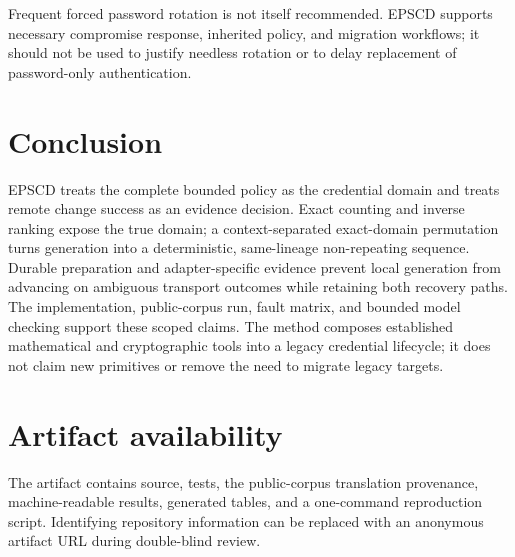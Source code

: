 \documentclass[preprint,12pt]{elsarticle}
\begin{document}
Frequent forced password rotation is not itself recommended. EPSCD supports
necessary compromise response, inherited policy, and migration workflows; it
should not be used to justify needless rotation or to delay replacement of
password-only authentication.

\section{Conclusion}

EPSCD treats the complete bounded policy as the credential domain and treats
remote change success as an evidence decision. Exact counting and inverse
ranking expose the true domain; a context-separated exact-domain permutation
turns generation into a deterministic, same-lineage non-repeating sequence.
Durable preparation and adapter-specific evidence prevent local generation from
advancing on ambiguous transport outcomes while retaining both recovery paths.
The implementation, public-corpus run, fault matrix, and bounded model checking
support these scoped claims. The method composes established mathematical and
cryptographic tools into a legacy credential lifecycle; it does not claim new
primitives or remove the need to migrate legacy targets.

\section*{Artifact availability}

The artifact contains source, tests, the public-corpus translation provenance,
machine-readable results, generated tables, and a one-command reproduction
script. Identifying repository information can be replaced with an anonymous
artifact URL during double-blind review.



\end{document}
